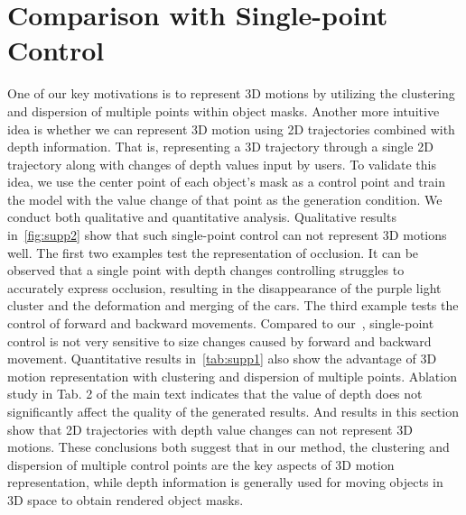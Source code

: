\section{Comparison with Single-point Control}\label{sec:single_point}
One of our key motivations is to represent 3D motions by utilizing the clustering and dispersion of multiple points within object masks. Another more intuitive idea is whether we can represent 3D motion using 2D trajectories combined with depth information. That is, representing a 3D trajectory through a single 2D trajectory along with changes of depth values input by users. To validate this idea, we use the center point of each object's mask as a control point and train the model with the value change of that point as the generation condition. We conduct both qualitative and quantitative analysis. Qualitative results in~\cref{fig:supp2} show that such single-point control can not represent 3D motions well. The first two examples test the representation of occlusion. It can be observed that a single point with depth changes controlling struggles to accurately express occlusion, resulting in the disappearance of the purple light cluster and the deformation and merging of the cars. The third example tests the control of forward and backward movements. Compared to our~\method, single-point control is not very sensitive to size changes caused by forward and backward movement. Quantitative results in~\cref{tab:supp1} also show the advantage of 3D motion representation with clustering and dispersion of multiple points. Ablation study in Tab. 2 of the main text indicates that the value of depth does not significantly affect the quality of the generated results. And results in this section show that 2D trajectories with depth value changes can not represent 3D motions. These conclusions both suggest that in our method, the clustering and dispersion of multiple control points are the key aspects of 3D motion representation, while depth information is generally used for moving objects in 3D space to obtain rendered object masks.

